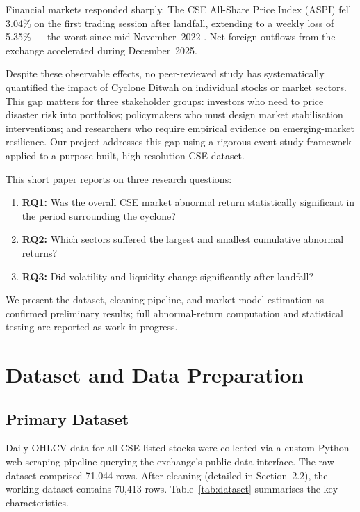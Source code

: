 \documentclass[sigconf, nonacm]{acmart}
\begin{document}
Financial markets responded sharply. The CSE All-Share Price Index (ASPI) fell 3.04\% on the first trading session after landfall, extending to a weekly loss of 5.35\% --- the worst since mid-November~2022 \cite{brecorder2025}. Net foreign outflows from the exchange accelerated during December~2025.

Despite these observable effects, no peer-reviewed study has systematically quantified the impact of Cyclone Ditwah on individual stocks or market sectors. This gap matters for three stakeholder groups: investors who need to price disaster risk into portfolios; policymakers who must design market stabilisation interventions; and researchers who require empirical evidence on emerging-market resilience. Our project addresses this gap using a rigorous event-study framework \cite{mackinlay1997} applied to a purpose-built, high-resolution CSE dataset.

This short paper reports on three research questions:
\begin{enumerate}
    \item \textbf{RQ1:} Was the overall CSE market abnormal return statistically significant in the period surrounding the cyclone?
    \item \textbf{RQ2:} Which sectors suffered the largest and smallest cumulative abnormal returns?
    \item \textbf{RQ3:} Did volatility and liquidity change significantly after landfall?
\end{enumerate}

We present the dataset, cleaning pipeline, and market-model estimation as confirmed preliminary results; full abnormal-return computation and statistical testing are reported as work in progress.

\section{Dataset and Data Preparation}

\subsection{Primary Dataset}

Daily OHLCV data for all CSE-listed stocks were collected via a custom Python web-scraping pipeline querying the exchange's public data interface. The raw dataset comprised 71,044 rows. After cleaning (detailed in Section~2.2), the working dataset contains 70,413 rows. Table~\ref{tab:dataset} summarises the key characteristics.
\end{document}
